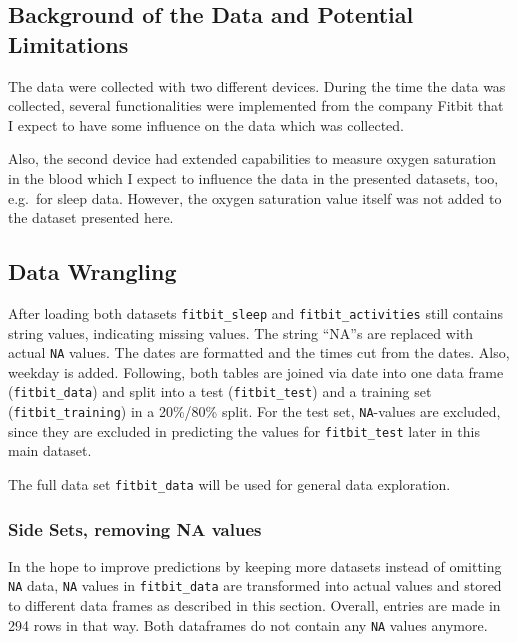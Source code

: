 \documentclass[
]{article}
\begin{document}
\hypertarget{background-of-the-data-and-potential-limitations}{%
\subsection{Background of the Data and Potential
Limitations}\label{background-of-the-data-and-potential-limitations}}

The data were collected with two different devices. During the time the
data was collected, several functionalities were implemented from the
company Fitbit that I expect to have some influence on the data which
was collected.

Also, the second device had extended capabilities to measure oxygen
saturation in the blood which I expect to influence the data in the
presented datasets, too, e.g.~for sleep data. However, the oxygen
saturation value itself was not added to the dataset presented here.

\hypertarget{data-wrangling}{%
\subsection{Data Wrangling}\label{data-wrangling}}

After loading both datasets \texttt{fitbit\_sleep} and
\texttt{fitbit\_activities} still contains string values, indicating
missing values. The string ``NA''s are replaced with actual \texttt{NA}
values. The dates are formatted and the times cut from the dates. Also,
weekday is added. Following, both tables are joined via date into one
data frame (\texttt{fitbit\_data}) and split into a test
(\texttt{fitbit\_test}) and a training set (\texttt{fitbit\_training})
in a 20\%/80\% split. For the test set, \texttt{NA}-values are excluded,
since they are excluded in predicting the values for
\texttt{fitbit\_test} later in this main dataset.

The full data set \texttt{fitbit\_data} will be used for general data
exploration.

\hypertarget{side-sets-removing-na-values}{%
\subsubsection{Side Sets, removing NA
values}\label{side-sets-removing-na-values}}

In the hope to improve predictions by keeping more datasets instead of
omitting \texttt{NA} data, \texttt{NA} values in \texttt{fitbit\_data}
are transformed into actual values and stored to different data frames
as described in this section. Overall, entries are made in 294 rows in
that way. Both dataframes do not contain any \texttt{NA} values anymore.
\end{document}
